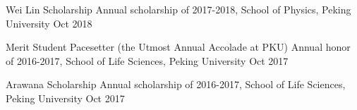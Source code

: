 \begin{cvhonors}

\cvhonor
{Wei Lin Scholarship } %
{Annual scholarship of 2017-2018, School of Physics, Peking University} %
{Oct 2018} %


\cvhonor
{Merit Student Pacesetter (the Utmost Annual Accolade at PKU)} %
{Annual honor of 2016-2017, School of Life Sciences, Peking University} %
{Oct 2017} %


\cvhonor
{Arawana Scholarship} %
{Annual scholarship of 2016-2017, School of Life Sciences, Peking University} %
{Oct 2017} %





\end{cvhonors}
